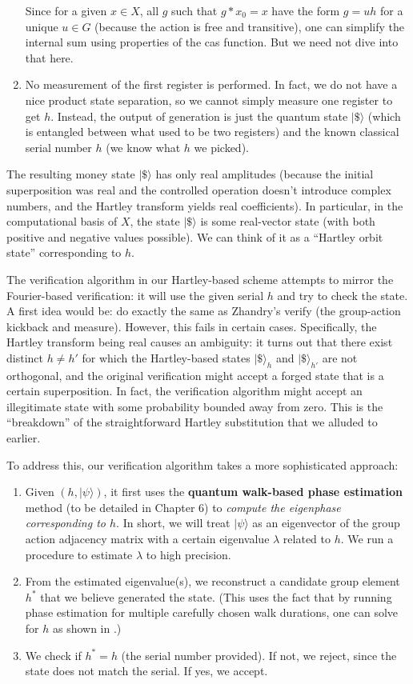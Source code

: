 \documentclass[12pt]{report}
\begin{document}
\begin{enumerate}
\[    \] 
    Since for a given $x\in X$, all $g$ such that $g*x_0=x$ have the form $g = u h$ for a unique $u \in G$ (because the action is free and transitive), one can simplify the internal sum using properties of the cas function. But we need not dive into that here.
    \item No measurement of the first register is performed. In fact, we do not have a nice product state separation, so we cannot simply measure one register to get $h$. Instead, the output of generation is just the quantum state $|\$\rangle$ (which is entangled between what used to be two registers) and the known classical serial number $h$ (we know what $h$ we picked).
\end{enumerate}

The resulting money state $|\$\rangle$ has only real amplitudes (because the initial superposition was real and the controlled operation doesn’t introduce complex numbers, and the Hartley transform yields real coefficients). In particular, in the computational basis of $X$, the state $|\$\rangle$ is some real-vector state (with both positive and negative values possible). We can think of it as a “Hartley orbit state” corresponding to $h$.

The verification algorithm in our Hartley-based scheme attempts to mirror the Fourier-based verification: it will use the given serial $h$ and try to check the state. A first idea would be: do exactly the same as Zhandry’s verify (the group-action kickback and measure). However, this fails in certain cases. Specifically, the Hartley transform being real causes an ambiguity: it turns out that there exist distinct $h \neq h'$ for which the Hartley-based states $|\$\rangle_h$ and $|\$\rangle_{h'}$ are not orthogonal, and the original verification might accept a forged state that is a certain superposition. In fact, the verification algorithm might accept an illegitimate state with some probability bounded away from zero. This is the “breakdown” of the straightforward Hartley substitution that we alluded to earlier.

To address this, our verification algorithm takes a more sophisticated approach:
\begin{enumerate}
    \item Given $(h, |\psi\rangle)$, it first uses the \textbf{quantum walk-based phase estimation} method (to be detailed in Chapter 6) to \emph{compute the eigenphase corresponding to $h$}. In short, we will treat $|\psi\rangle$ as an eigenvector of the group action adjacency matrix with a certain eigenvalue $\lambda$ related to $h$. We run a procedure to estimate $\lambda$ to high precision.
    \item From the estimated eigenvalue(s), we reconstruct a candidate group element $h^*$ that we believe generated the state. (This uses the fact that by running phase estimation for multiple carefully chosen walk durations, one can solve for $h$ as shown in \cite{Zhandry2022}.)
    \item We check if $h^* = h$ (the serial number provided). If not, we reject, since the state does not match the serial. If yes, we accept.
\end{enumerate}
\end{document}
